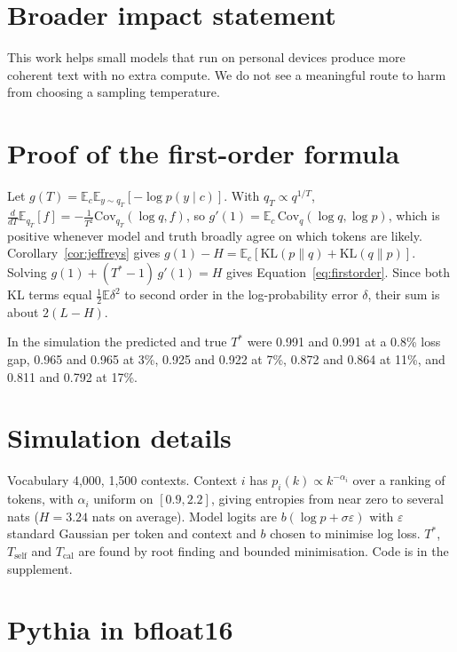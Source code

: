 \documentclass[10pt]{article}
\newcommand{\E}{\mathbb{E}}
\newcommand{\KL}{\mathrm{KL}}
\newcommand{\Ts}{T^{*}}
\begin{document}
\section*{Broader impact statement}

This work helps small models that run on personal devices produce more coherent text with no extra compute. We do not see a meaningful route to harm from choosing a sampling temperature.




\appendix

\section{Proof of the first-order formula}
\label{app:firstorder}

Let $g(T) = \E_c \E_{y\sim q_T}[-\log p(y \mid c)]$. With $q_T \propto q^{1/T}$, $\tfrac{d}{dT}\E_{q_T}[f] = -\tfrac{1}{T^2}\mathrm{Cov}_{q_T}(\log q, f)$, so $g'(1) = \E_c\, \mathrm{Cov}_q(\log q, \log p)$, which is positive whenever model and truth broadly agree on which tokens are likely. Corollary~\ref{cor:jeffreys} gives $g(1) - H = \E_c[\KL(p\|q) + \KL(q\|p)]$. Solving $g(1) + (\Ts - 1)\,g'(1) = H$ gives Equation~\ref{eq:firstorder}. Since both KL terms equal $\tfrac12 \E \delta^2$ to second order in the log-probability error $\delta$, their sum is about $2(L - H)$.

In the simulation the predicted and true $\Ts$ were 0.991 and 0.991 at a 0.8\% loss gap, 0.965 and 0.965 at 3\%, 0.925 and 0.922 at 7\%, 0.872 and 0.864 at 11\%, and 0.811 and 0.792 at 17\%.

\section{Simulation details}
\label{app:sim}

Vocabulary 4{,}000, 1{,}500 contexts. Context $i$ has $p_i(k) \propto k^{-\alpha_i}$ over a ranking of tokens, with $\alpha_i$ uniform on $[0.9, 2.2]$, giving entropies from near zero to several nats ($H = 3.24$ nats on average). Model logits are $b(\log p + \sigma \varepsilon)$ with $\varepsilon$ standard Gaussian per token and context and $b$ chosen to minimise log loss. $\Ts$, $T_{\text{self}}$ and $T_{\text{cal}}$ are found by root finding and bounded minimisation. Code is in the supplement.

\section{Pythia in bfloat16}
\label{app:bf16}
\end{document}
